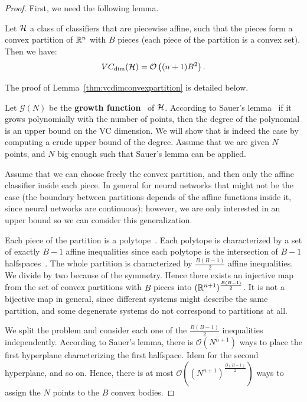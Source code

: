             \begin{proof}
            First, we need the following lemma.
            \begin{lemma}\label{thm:vcdimconvexpartition}
                    Let $\mathcal{H}$ a class of classifiers that are piecewise affine, such that the pieces form a convex partition of $\mathbb{R}^n$ with $B$ pieces (each piece of the partition is a convex set). Then we have:
                    $$VC_{\text{dim}}(\mathcal{H})=\mathcal{O}\left((n+1)B^2\right).$$
                \end{lemma}
                The proof of Lemma~\ref{thm:vcdimconvexpartition} is detailed below.  
                  
                Let $\mathcal{G}(N)$ be the \textbf{growth function}~\cite{vapnik2013nature} of $\mathcal{H}$. According to Sauer's lemma~\cite{vapnik2013nature} if it grows polynomially with the number of points, then the degree of the polynomial is an upper bound on the VC dimension. We will show that is indeed the case by computing a crude upper bound of the degree. Assume that we are given $N$ points, and $N$ big enough such that Sauer's lemma can be applied.  
                  
                Assume that we can choose freely the convex partition, and then only the affine classifier inside each piece. In general for neural networks that might not be the case (the boundary between partitions depends of the affine functions inside it, since neural networks are continuous); however, we are only interested in an upper bound so we can consider this generalization.  
                  
                Each piece of the partition is a polytope~\cite{leon2018spaces}. Each polytope is characterized by a set of exactly $B-1$ affine inequalities since each polytope is the intersection of $B-1$ halfspaces~\cite{leon2018spaces}. The whole partition is characterized by $\frac{B(B-1)}{2}$ affine inequalities. We divide by two because of the symmetry. Hence there exists an injective map from the set of convex partitions with $B$ pieces into $(\mathbb{R}^{n+1})^{\frac{B(B-1)}{2}}$. It is not a bijective map in general, since different systems might describe the same partition, and some degenerate systems do not correspond to partitions at all.  
                  
                We split the problem and consider each one of the $\frac{B(B-1)}{2}$ inequalities independently. According to Sauer's lemma, there is $\mathcal{O}(N^{n+1})$ ways to place the first hyperplane characterizing the first halfspace. Idem for the second hyperplane, and so on. Hence, there is at most $\mathcal{O}((N^{n+1})^{\frac{B(B-1)}{2}})$ ways to assign the $N$ points to the $B$ convex bodies.  
                  

\end{proof}
